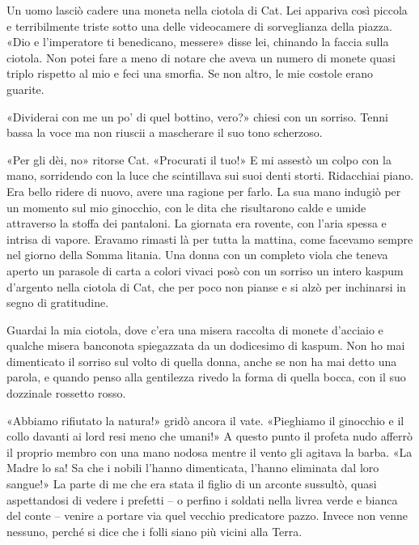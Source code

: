 Un uomo lasciò cadere una moneta nella ciotola di Cat. Lei appariva così
piccola e terribilmente triste sotto una delle videocamere di
sorveglianza della piazza. «Dio e l'imperatore ti benedicano, messere»
disse lei, chinando la faccia sulla ciotola. Non potei fare a meno di
notare che aveva un numero di monete quasi triplo rispetto al mio e feci
una smorfia. Se non altro, le mie costole erano guarite.

«Dividerai con me un po' di quel bottino, vero?» chiesi con un sorriso.
Tenni bassa la voce ma non riuscii a mascherare il suo tono scherzoso.

«Per gli dèi, no» ritorse Cat. «Procurati il tuo!» E mi assestò un colpo
con la mano, sorridendo con la luce che scintillava sui suoi denti
storti. Ridacchiai piano. Era bello ridere di nuovo, avere una ragione
per farlo. La sua mano indugiò per un momento sul mio ginocchio, con le
dita che risultarono calde e umide attraverso la stoffa dei pantaloni.
La giornata era rovente, con l'aria spessa e intrisa di vapore. Eravamo
rimasti là per tutta la mattina, come facevamo sempre nel giorno della
Somma litania. Una donna con un completo viola che teneva aperto un
parasole di carta a colori vivaci posò con un sorriso un intero kaspum
d'argento nella ciotola di Cat, che per poco non pianse e si alzò per
inchinarsi in segno di gratitudine.

Guardai la mia ciotola, dove c'era una misera raccolta di monete
d'acciaio e qualche misera banconota spiegazzata da un dodicesimo di
kaspum. Non ho mai dimenticato il sorriso sul volto di quella donna,
anche se non ha mai detto una parola, e quando penso alla gentilezza
rivedo la forma di quella bocca, con il suo dozzinale rossetto rosso.

«Abbiamo rifiutato la natura!» gridò ancora il vate. «Pieghiamo il
ginocchio e il collo davanti ai lord resi meno che umani!» A questo
punto il profeta nudo afferrò il proprio membro con una mano nodosa
mentre il vento gli agitava la barba. «La Madre lo sa! Sa che i nobili
l'hanno dimenticata, l'hanno eliminata dal loro sangue!» La parte di me
che era stata il figlio di un arconte sussultò, quasi aspettandosi di
vedere i prefetti -- o perfino i soldati nella livrea verde e bianca del
conte -- venire a portare via quel vecchio predicatore pazzo. Invece non
venne nessuno, perché si dice che i folli siano più vicini alla Terra.

